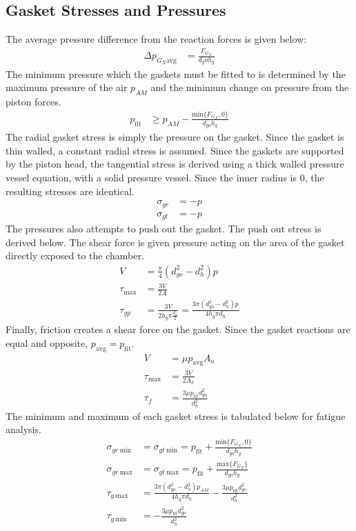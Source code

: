 \documentclass[10pt,a4paper]{article}
\begin{document}
	\subsection*{Gasket Stresses and Pressures}
	The average pressure difference from the reaction forces is given below:
	\begin{align}
	 \Delta p_{G_X \text{avg}} &= \frac{F_{G_X}}{d_go h_g}
	\end{align}
	The minimum pressure which the gaskets must be fitted to is determined by the maximum pressure of the air $p_{AM}$ and the minimum change on pressure from the piston forces.
	\begin{align}
	p_{\text{fit}} &\geq p_{AM} - \frac{\text{min} \{ F_{G_X}, 0 \}}{d_{go} h_g}
	\end{align}
	The radial gasket stress is simply the pressure on the gasket. Since the gasket is thin walled, a constant radial stress is assumed.
	Since the gaskets are supported by the piston head, the tangential stress is derived using a thick walled pressure vessel equation, with a solid pressure vessel. Since the inner radius is 0, the resulting stresses are identical.
	\begin{align}
		\sigma_{gr} &= -p\\
		\sigma_{gt} &= -p
	\end{align}
	The pressures also attempts to push out the gasket. The push out stress is derived below. The shear force is given pressure acting on the area of the gasket directly exposed to the chamber.
	\begin{align}
	 V &= \frac{\pi}{4}(d_{go}^2-d_{h}^2) p\\
	 \tau_{\text{max}} &= \frac{3V}{2A} \\
	 \tau_{gp} &= \frac{3V}{2 h_g \pi \frac{d_h}{2} } = \frac{3 \pi (d_{go}^2-d_{h}^2) p}{4 h_g \pi d_h} 
	\end{align}
	Finally, friction creates a shear force on the gasket. Since the gasket reactions are equal and opposite, $p_{\text{avg}} = p_{\text{fit}}$.
	\begin{align}
		V &=  \mu p_{\text{avg}} A_o \\
		\tau_{\text{max}} &= \frac{3V}{2A_h} \\
		\tau_{f} &= \frac{3 \mu p_{\text{fit}} d_{go}^2}{d_h^2} 
	\end{align}
	The minimum and maximum of each gasket stress is tabulated below for fatigue analysis.
	\begin{align}
		\sigma_{gr\ \text{min}} &= \sigma_{gt\ \text{min}} = p_{\text{fit}} + \frac{\text{min} \{ F_{G_X}, 0 \}}{d_{go} h_g}\\
		\sigma_{gr\ \text{max}} &= \sigma_{gt\ \text{max}} = p_{\text{fit}} + \frac{\text{max} \{ F_{G_X}\}}{d_{go} h_g}\\
		\tau_{g\ \text{max}} &= \frac{3 \pi (d_{go}^2-d_{h}^2) p_{AM}}{4 h_g \pi d_h} - \frac{3 \mu p_{\text{fit}} d_{go}^2}{d_h^2}\\
		\tau_{g\  \text{min}} &= -\frac{3 \mu p_{\text{fit}} d_{go}^2}{d_h^2}
	\end{align}
\end{document}

